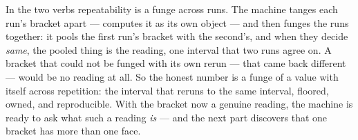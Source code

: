 In the two verbs repeatability is a funge across runs. The machine tanges each run's bracket apart --- computes it as
its own object --- and then funges the runs together: it pools the first run's bracket with the second's, and when they
decide \emph{same}, the pooled thing is the reading, one interval that two runs agree on. A bracket that could not be
funged with its own rerun --- that came back different --- would be no reading at all. So the honest number is a funge
of a value with itself across repetition: the interval that reruns to the same interval, floored, owned, and
reproducible. With the bracket now a genuine reading, the machine is ready to ask what such a reading \emph{is} --- and
the next part discovers that one bracket has more than one face.
